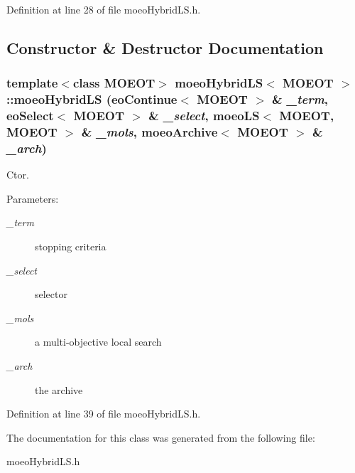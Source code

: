 Definition at line 28 of file moeo\-Hybrid\-LS.h.

\subsection{Constructor \& Destructor Documentation}
\subsubsection{\setlength{\rightskip}{0pt plus 5cm}template$<$class MOEOT$>$ \bf{moeo\-Hybrid\-LS}$<$ MOEOT $>$::\bf{moeo\-Hybrid\-LS} (\bf{eo\-Continue}$<$ MOEOT $>$ \& {\em \_\-term}, \bf{eo\-Select}$<$ MOEOT $>$ \& {\em \_\-select}, \bf{moeo\-LS}$<$ MOEOT, MOEOT $>$ \& {\em \_\-mols}, \bf{moeo\-Archive}$<$ MOEOT $>$ \& {\em \_\-arch})\hspace{0.3cm}{\tt  [inline]}}\label{classmoeoHybridLS_e669b2ca5e17467eb9819c71557aad53}


Ctor. 

\begin{Desc}
\item[Parameters:]
\begin{description}
\item[{\em \_\-term}]stopping criteria \item[{\em \_\-select}]selector \item[{\em \_\-mols}]a multi-objective local search \item[{\em \_\-arch}]the archive \end{description}
\end{Desc}


Definition at line 39 of file moeo\-Hybrid\-LS.h.

The documentation for this class was generated from the following file:\begin{CompactItemize}
\item 
moeo\-Hybrid\-LS.h\end{CompactItemize}
